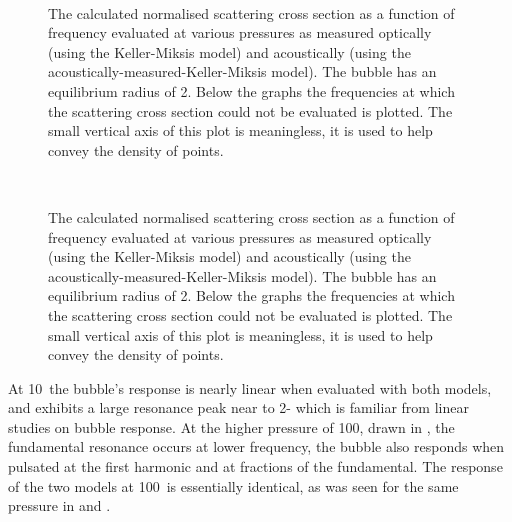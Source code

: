  \begin{figure}[p!]
      \centering
     \\
      \label{fig:nxs_low} 
 \caption{The calculated normalised scattering cross section as a function of frequency evaluated at various pressures as measured optically (using the Keller-Miksis model) and acoustically (using the acoustically-measured-Keller-Miksis model). The bubble has an equilibrium radius of \unit{2}\micro\metre. 
Below the graphs the frequencies at which the scattering cross section could not be evaluated is plotted.
The small vertical axis of this plot is meaningless, it is used to help convey the density of points.
}
 \end{figure}
\begin{figure}[p!]
      \centering
 \\
      \caption{The calculated normalised scattering cross section as a function of frequency evaluated at various pressures as measured optically (using the Keller-Miksis model) and acoustically (using the acoustically-measured-Keller-Miksis model). The bubble has an equilibrium radius of \unit{2}\micro\metre. 
Below the graphs the frequencies at which the scattering cross section could not be evaluated is plotted.
The small vertical axis of this plot is meaningless, it is used to help convey the density of points.
}
      \label{fig:nxs_high}
 \end{figure}



At \unit{10}\kilo\pascal\ the  bubble's response is nearly linear when evaluated with both models,
and  exhibits a large resonance peak near to \unit{2}\mega\hertz  -
which is familiar from linear studies on bubble response\cite{Hoff2001}.
At the higher pressure of  \unit{100}\kilo\pascal, drawn in , the fundamental resonance occurs at lower frequency, the bubble also responds when pulsated at the first harmonic and at fractions of the fundamental. 
The response of the two models at  \unit{100}\kilo\pascal\ is essentially identical, 
as was seen for the same pressure in   and .

